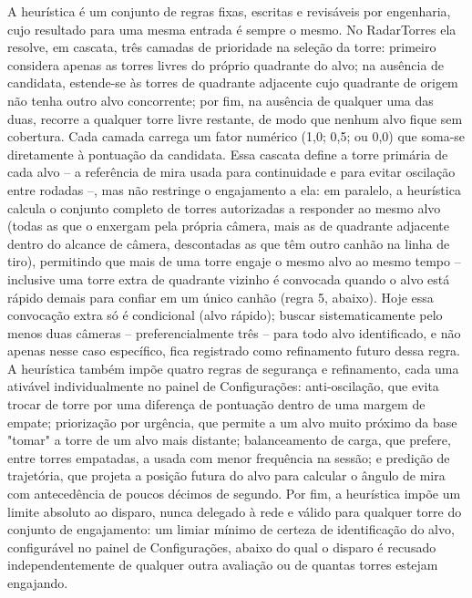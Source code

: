 \documentclass[12pt,a4paper]{article}
\begin{document}
A heurística é um conjunto de regras fixas, escritas e revisáveis por engenharia, cujo resultado
para uma mesma entrada é sempre o mesmo. No RadarTorres ela resolve, em cascata, três camadas de
prioridade na seleção da torre: primeiro considera apenas as torres livres do próprio quadrante do
alvo; na ausência de candidata, estende-se às torres de quadrante adjacente cujo quadrante de
origem não tenha outro alvo concorrente; por fim, na ausência de qualquer uma das duas, recorre a
qualquer torre livre restante, de modo que nenhum alvo fique sem cobertura. Cada camada carrega um
fator numérico (1,0; 0,5; ou 0,0) que soma-se diretamente à pontuação da candidata. Essa cascata
define a torre primária de cada alvo -- a referência de mira usada para continuidade e para evitar
oscilação entre rodadas --, mas não restringe o engajamento a ela: em paralelo, a heurística
calcula o conjunto completo de torres autorizadas a responder ao mesmo alvo (todas as que o
enxergam pela própria câmera, mais as de quadrante adjacente dentro do alcance de câmera,
descontadas as que têm outro canhão na linha de tiro), permitindo que mais de uma torre engaje o
mesmo alvo ao mesmo tempo -- inclusive uma torre extra de quadrante vizinho é convocada quando o
alvo está rápido demais para confiar em um único canhão (regra 5, abaixo). Hoje essa convocação
extra só é condicional (alvo rápido); buscar sistematicamente pelo menos duas câmeras --
preferencialmente três -- para todo alvo identificado, e não apenas nesse caso específico, fica
registrado como refinamento futuro dessa regra. A heurística
também impõe quatro regras de segurança e refinamento, cada uma ativável individualmente no painel de
Configurações: anti-oscilação, que evita trocar de torre por uma diferença de pontuação dentro de
uma margem de empate; priorização por urgência, que permite a um alvo muito próximo da base "tomar"
a torre de um alvo mais distante; balanceamento de carga, que prefere, entre torres empatadas, a
usada com menor frequência na sessão; e predição de trajetória, que projeta a posição futura do
alvo para calcular o ângulo de mira com antecedência de poucos décimos de segundo. Por fim, a
heurística impõe um limite absoluto ao disparo, nunca delegado à rede e válido para qualquer torre
do conjunto de engajamento: um limiar mínimo de certeza de identificação do alvo, configurável no
painel de Configurações, abaixo do qual o disparo é recusado independentemente
de qualquer outra avaliação ou de quantas torres estejam engajando.
\end{document}
